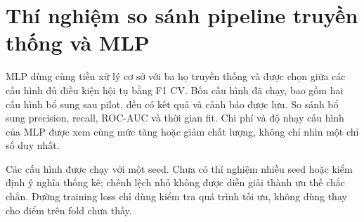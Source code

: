 \section{Thí nghiệm so sánh pipeline truyền thống và MLP}
\label{sec:5_7}
MLP dùng cùng tiền xử lý cơ sở với ba họ truyền thống và được chọn giữa các cấu hình đủ điều kiện hội tụ bằng F1 CV. Bốn cấu hình đã chạy, bao gồm hai cấu hình bổ sung sau pilot, đều có kết quả và cảnh báo được lưu. So sánh bổ sung precision, recall, ROC-AUC và thời gian fit. Chi phí và độ nhạy cấu hình của MLP được xem cùng mức tăng hoặc giảm chất lượng, không chỉ nhìn một chỉ số duy nhất.

Các cấu hình được chạy với một seed. Chưa có thí nghiệm nhiều seed hoặc kiểm định ý nghĩa thống kê; chênh lệch nhỏ không được diễn giải thành ưu thế chắc chắn. Đường training loss chỉ dùng kiểm tra quá trình tối ưu, không dùng thay cho điểm trên fold chưa thấy.
